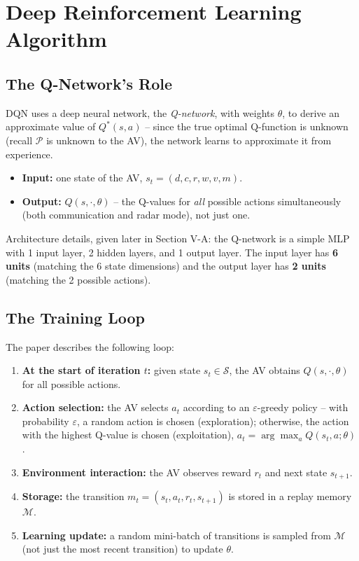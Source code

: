 \documentclass[11pt]{article}
\begin{document}
\section{Deep Reinforcement Learning Algorithm}

\subsection{The Q-Network's Role}
DQN uses a deep neural network, the \emph{Q-network}, with weights $\theta$, to derive
an approximate value of $Q^*(s,a)$ -- since the true optimal Q-function is unknown
(recall $\mathcal{P}$ is unknown to the AV), the network learns to approximate it from
experience.

\begin{itemize}[leftmargin=1.5em]
    \item \textbf{Input:} one state of the AV, $s_t = (d,c,r,w,v,m)$.
    \item \textbf{Output:} $Q(s,\cdot,\theta)$ -- the Q-values for \emph{all} possible
    actions simultaneously (both communication and radar mode), not just one.
\end{itemize}

\begin{remark}
Architecture details, given later in Section V-A: the Q-network is a simple MLP with 1
input layer, 2 hidden layers, and 1 output layer. The input layer has \textbf{6 units}
(matching the 6 state dimensions) and the output layer has \textbf{2 units} (matching
the 2 possible actions).
\end{remark}

\subsection{The Training Loop}
The paper describes the following loop:

\begin{enumerate}[leftmargin=1.5em]
    \item \textbf{At the start of iteration $t$:} given state $s_t \in \mathcal{S}$,
    the AV obtains $Q(s,\cdot,\theta)$ for all possible actions.
    \item \textbf{Action selection:} the AV selects $a_t$ according to an
    $\varepsilon$-greedy policy \cite{mnih2015} -- with probability $\varepsilon$, a
    random action is chosen (exploration); otherwise, the action with the highest
    Q-value is chosen (exploitation), $a_t = \arg\max_a Q(s_t,a;\theta)$.
    \item \textbf{Environment interaction:} the AV observes reward $r_t$ and next state
    $s_{t+1}$.
    \item \textbf{Storage:} the transition $m_t = (s_t, a_t, r_t, s_{t+1})$ is stored in
    a replay memory $\mathcal{M}$.
    \item \textbf{Learning update:} a random mini-batch of transitions is sampled from
    $\mathcal{M}$ (not just the most recent transition) to update $\theta$.
\end{enumerate}
\end{document}
